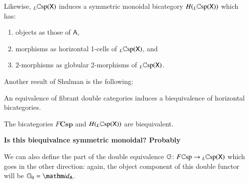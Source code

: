 \documentclass{amsart}
\begin{document}
Likewise, $_L \mathbb{C}\textnormal{sp}(\mathsf{X})$ induces a symmetric monoidal bicategory $H( {_L \mathbb{C}\textnormal{sp}(\mathsf{X})})$ which has:
\begin{enumerate}
\item{objects as those of $\mathsf{A}$,}
\item{morphisms as horizontal 1-cells of $_L \mathbb{C}\textnormal{sp}(\mathsf{X})$, and}
\item{2-morphisms as globular 2-morphisms of $_L \mathbb{C}\textnormal{sp}(\mathsf{X})$.}
\end{enumerate}
Another result of Shulman \cite{Shul2} is the following:
\begin{prop}
An equivalence of fibrant double categories induces a biequivalence of horizontal bicategories.
\end{prop}
\begin{cor}
The bicategories $F\mathbf{Csp}$ and $H( {_L \mathbb{C}\textnormal{sp}(\mathsf{X})})$ are biequivalent.
\end{cor}

\textbf{Is this biequivalnce symmetric monoidal? Probably}
\newline

We can also define the part of the double equivalence $\mathbb{G} \colon F\mathbb{C}\textnormal{sp} \to {_L \mathbb{C} \textnormal{sp}(\mathsf{X})}$ which goes in the other direction: again, the object component of this double functor will be $\mathbb{G}_0 = \id_{\mathsf{A}}$.
\end{document}
